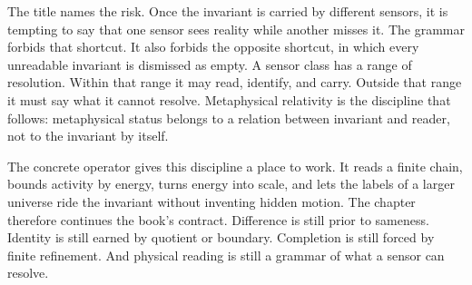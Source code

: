 The title names the risk. Once the invariant is carried by different
sensors, it is tempting to say that one sensor sees reality while another
misses it. The grammar forbids that shortcut. It also forbids the opposite
shortcut, in which every unreadable invariant is dismissed as empty. A
sensor class has a range of resolution. Within that range it may read,
identify, and carry. Outside that range it must say what it cannot resolve.
Metaphysical relativity is the discipline that follows: metaphysical status
belongs to a relation between invariant and reader, not to the invariant by
itself.

The concrete operator gives this discipline a place to work. It reads a
finite chain, bounds activity by energy, turns energy into scale, and lets
the labels of a larger universe ride the invariant without inventing hidden
motion. The chapter therefore continues the book's contract. Difference is
still prior to sameness. Identity is still earned by quotient or boundary.
Completion is still forced by finite refinement. And physical reading is
still a grammar of what a sensor can resolve.
